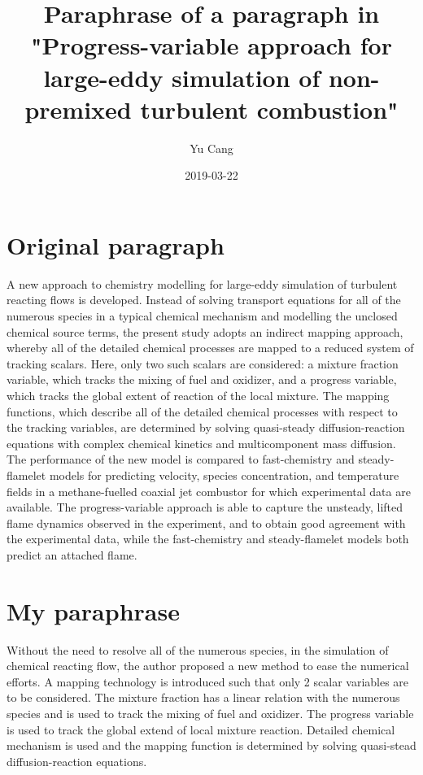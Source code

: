 \documentclass[paper=a4, fontsize=11pt]{scrartcl}
\title{Paraphrase of  a paragraph in "Progress-variable approach for large-eddy simulation of non-premixed turbulent combustion"}
\author{Yu Cang \quad 018370210001}
\date{2019-03-22}
\begin{document}
\maketitle

\section{Original paragraph}
	A new approach to chemistry modelling for large-eddy simulation of turbulent reacting flows is developed. Instead of solving transport equations for all of the numerous species in a typical chemical mechanism and modelling the unclosed chemical source terms, the present study adopts an indirect mapping approach, whereby all of the detailed chemical processes are mapped to a reduced system of tracking scalars. Here, only two such scalars are considered: a mixture fraction variable, which tracks the mixing of fuel and oxidizer, and a progress variable, which tracks the global extent of reaction of the local mixture. The mapping functions, which describe all of the detailed chemical processes with respect to the tracking variables, are determined by solving quasi-steady diffusion-reaction equations with complex chemical kinetics and multicomponent mass diffusion. The performance of the new model is compared to fast-chemistry and steady-flamelet models for predicting velocity, species concentration, and temperature fields in a methane-fuelled coaxial jet combustor for which experimental data are available. The progress-variable approach is able to capture the unsteady, lifted flame dynamics observed in the experiment, and to obtain good agreement with the experimental data, while the fast-chemistry and steady-flamelet models both predict an attached flame.
\section{My paraphrase}
	Without the need to resolve all of the numerous species, in the simulation of chemical reacting flow, the author proposed a new method to ease the numerical efforts.\newline
	A mapping technology is introduced such that only 2 scalar variables are to be considered. The mixture fraction has a linear relation with the numerous species and is used to track the mixing of fuel and oxidizer. The progress variable is used to track the global extend of local mixture reaction.\newline
	Detailed chemical mechanism is used and the mapping function is determined by solving quasi-stead diffusion-reaction equations.
\end{document}
